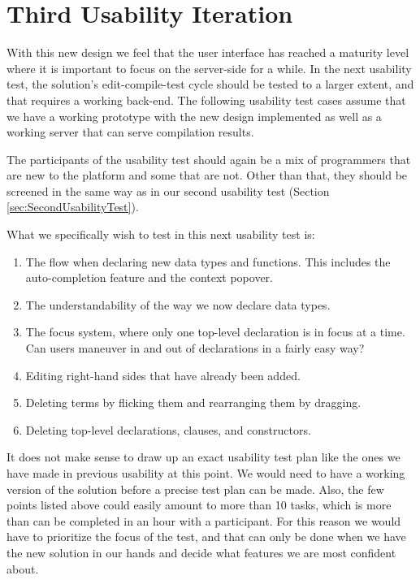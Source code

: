 \section{Third Usability Iteration}
\label{subsec:third_usability_test}
With this new design we feel that the user interface has reached a maturity
level where it is important to focus on the server-side for a while. In the
next usability test, the solution's edit-compile-test cycle should be tested to
a larger extent, and that requires a working back-end. The following usability
test cases assume that we have a working prototype with the new design
implemented as well as a working server that can serve compilation results.

The participants of the usability test should again be a mix of programmers
that are new to the platform and some that are not. Other than that, they
should be screened in the same way as in our second usability test (Section
\ref{sec:SecondUsabilityTest}).

What we specifically wish to test in this next usability test is:

\begin{enumerate}
	\item The flow when declaring new data types and functions. This includes the auto-completion feature and the context popover.
	\item The understandability of the way we now declare data types.
	\item The focus system, where only one top-level declaration is in focus at a
	time. Can users maneuver in and out of declarations in a fairly easy way?
	\item Editing right-hand sides that have already been added.
	\item Deleting terms by flicking them and rearranging them by dragging.
	\item Deleting top-level declarations, clauses, and constructors.
\end{enumerate}

It does not make sense to draw up an exact usability test plan like the ones we have made in previous usability
at this point. We would need to have a working version of the solution before a precise test plan can be made. Also, the few points listed above could easily amount to more than 10 tasks, which is more than can be completed in an hour with a participant. For this reason we would have to prioritize the focus of the test, and that can only be done when we have the new solution in our hands and decide what features we are most confident about. 
